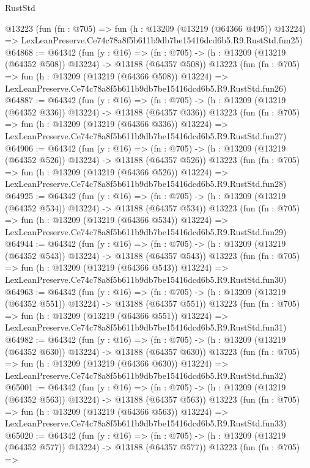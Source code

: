 \begin{lexlean}{RustStd}
\begin{coremodule}
    @13223
    (fun (fn : @705) =>
    fun (h : @13209 (@13219 (@64366 @495)) @13224) =>
    LexLeanPreserve.Ce74c78a8f5b611b9db7be15416dcd6b5.R9.RustStd.fun25)
@64868 := @64342
    (fun (y : @16) =>
    (fn : @705) -> (h : @13209 (@13219 (@64352 @508)) @13224) -> @13188 (@64357 @508))
    @13223
    (fun (fn : @705) =>
    fun (h : @13209 (@13219 (@64366 @508)) @13224) =>
    LexLeanPreserve.Ce74c78a8f5b611b9db7be15416dcd6b5.R9.RustStd.fun26)
@64887 := @64342
    (fun (y : @16) =>
    (fn : @705) -> (h : @13209 (@13219 (@64352 @336)) @13224) -> @13188 (@64357 @336))
    @13223
    (fun (fn : @705) =>
    fun (h : @13209 (@13219 (@64366 @336)) @13224) =>
    LexLeanPreserve.Ce74c78a8f5b611b9db7be15416dcd6b5.R9.RustStd.fun27)
@64906 := @64342
    (fun (y : @16) =>
    (fn : @705) -> (h : @13209 (@13219 (@64352 @526)) @13224) -> @13188 (@64357 @526))
    @13223
    (fun (fn : @705) =>
    fun (h : @13209 (@13219 (@64366 @526)) @13224) =>
    LexLeanPreserve.Ce74c78a8f5b611b9db7be15416dcd6b5.R9.RustStd.fun28)
@64925 := @64342
    (fun (y : @16) =>
    (fn : @705) -> (h : @13209 (@13219 (@64352 @534)) @13224) -> @13188 (@64357 @534))
    @13223
    (fun (fn : @705) =>
    fun (h : @13209 (@13219 (@64366 @534)) @13224) =>
    LexLeanPreserve.Ce74c78a8f5b611b9db7be15416dcd6b5.R9.RustStd.fun29)
@64944 := @64342
    (fun (y : @16) =>
    (fn : @705) -> (h : @13209 (@13219 (@64352 @543)) @13224) -> @13188 (@64357 @543))
    @13223
    (fun (fn : @705) =>
    fun (h : @13209 (@13219 (@64366 @543)) @13224) =>
    LexLeanPreserve.Ce74c78a8f5b611b9db7be15416dcd6b5.R9.RustStd.fun30)
@64963 := @64342
    (fun (y : @16) =>
    (fn : @705) -> (h : @13209 (@13219 (@64352 @551)) @13224) -> @13188 (@64357 @551))
    @13223
    (fun (fn : @705) =>
    fun (h : @13209 (@13219 (@64366 @551)) @13224) =>
    LexLeanPreserve.Ce74c78a8f5b611b9db7be15416dcd6b5.R9.RustStd.fun31)
@64982 := @64342
    (fun (y : @16) =>
    (fn : @705) -> (h : @13209 (@13219 (@64352 @630)) @13224) -> @13188 (@64357 @630))
    @13223
    (fun (fn : @705) =>
    fun (h : @13209 (@13219 (@64366 @630)) @13224) =>
    LexLeanPreserve.Ce74c78a8f5b611b9db7be15416dcd6b5.R9.RustStd.fun32)
@65001 := @64342
    (fun (y : @16) =>
    (fn : @705) -> (h : @13209 (@13219 (@64352 @563)) @13224) -> @13188 (@64357 @563))
    @13223
    (fun (fn : @705) =>
    fun (h : @13209 (@13219 (@64366 @563)) @13224) =>
    LexLeanPreserve.Ce74c78a8f5b611b9db7be15416dcd6b5.R9.RustStd.fun33)
@65020 := @64342
    (fun (y : @16) =>
    (fn : @705) -> (h : @13209 (@13219 (@64352 @577)) @13224) -> @13188 (@64357 @577))
    @13223
    (fun (fn : @705) =>

\end{coremodule}
\end{lexlean}
